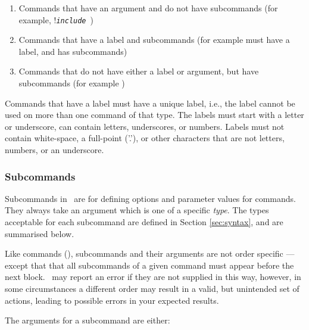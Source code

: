 \begin{enumerate}
\item Commands that have an argument and do not have subcommands (for example, !\texttt{\emph{include}}\ )
\item Commands that have a label and subcommands (for example  must have a label, and has subcommands)
\item Commands that do not have either a label or argument, but have subcommands (for example )
\end{enumerate}

Commands that have a label must have a unique label, i.e., the label cannot be used on more than one command of that type. The labels must start with a letter or underscore, can contain letters, underscores, or numbers. Labels must not contain white-space, a full-point ('.'), or other characters that are not letters, numbers, or an underscore.
\EX \EXend

\subsubsection{Subcommands}
\CH
Subcommands in \CNAME\ are for defining options and parameter values for commands. They always take an argument which is one of a specific \emph{type}. The types acceptable for each subcommand are defined in Section \ref{sec:syntax}, and are summarised below. 

Like commands (), subcommands and their arguments are not order specific --- except that that all subcommands of a given command must appear before the next  block. \CNAME\ may report an error if they are not supplied in this way, however, in some circumstances a different order may result in a valid, but unintended set of actions, leading to possible errors in your expected results.  

The arguments for a subcommand are either:

